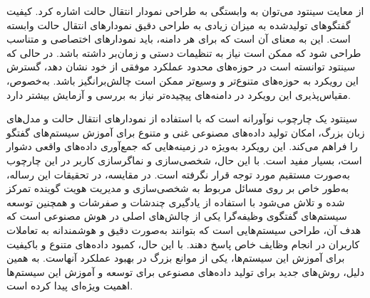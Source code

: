 \begin{enumerate}
از معایت سینتود می‌توان به وابستگی به طراحی نمودار انتقال حالت اشاره کرد. کیفیت گفتگوهای تولیدشده به میزان زیادی به طراحی دقیق نمودارهای انتقال حالت وابسته است. این به معنای آن است که برای هر دامنه، باید نمودارهای اختصاصی و متناسب طراحی شود که ممکن است نیاز به تنظیمات دستی و زمان‌بر داشته باشد.
\newline
در حالی که سینتود توانسته است در حوزه‌های محدود عملکرد موفقی از خود نشان دهد، گسترش این رویکرد به حوزه‌های متنوع‌تر و وسیع‌تر ممکن است چالش‌برانگیز باشد. به‌خصوص، مقیاس‌پذیری این رویکرد در دامنه‌های پیچیده‌تر نیاز به بررسی و آزمایش بیشتر دارد.


سینتود یک چارچوب نوآورانه است که با استفاده از نمودارهای انتقال حالت و مدل‌های زبان بزرگ، امکان تولید داده‌های مصنوعی غنی و متنوع برای آموزش سیستم‌های گفتگو را فراهم می‌کند. این رویکرد به‌ویژه در زمینه‌هایی که جمع‌آوری داده‌های واقعی دشوار است، بسیار مفید است. با این حال، شخصی‌سازی و نماگر‌سازی کاربر در این چارچوب به‌صورت مستقیم مورد توجه قرار نگرفته است. در مقایسه، در تحقیقات این رساله، به‌طور خاص بر روی مسائل مربوط به شخصی‌سازی و مدیریت هویت گوینده تمرکز شده و تلاش می‌شود با استفاده از یادگیری چند‌شات و صفر‌شات و همچنین توسعه سیستم‌های گفتگوی وظیفه‌گرا یکی از چالش‌های اصلی در هوش مصنوعی است که هدف آن، طراحی سیستم‌هایی است که بتوانند به‌صورت دقیق و هوشمندانه به تعاملات کاربران در انجام وظایف خاص پاسخ دهند. با این حال، کمبود داده‌های متنوع و باکیفیت برای آموزش این سیستم‌ها، یکی از موانع بزرگ در بهبود عملکرد آنهاست. به همین دلیل، روش‌های جدید برای تولید داده‌های مصنوعی برای توسعه و آموزش این سیستم‌ها اهمیت ویژه‌ای پیدا کرده است.\\



\end{enumerate}
